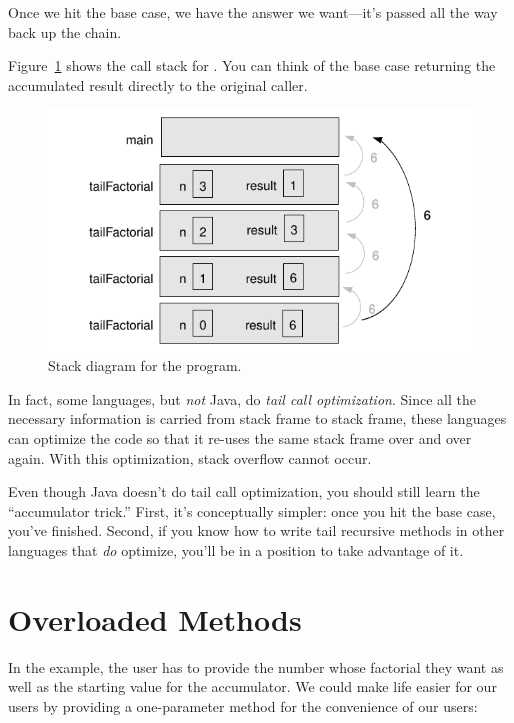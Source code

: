 Once we hit the base case, we have the answer we want---it's passed all the way back up the chain.

Figure~\ref{fig.tail_recursive} shows the call stack for . You can think of the base case returning the accumulated result directly to the original caller.

\begin{figure}[!htb]
\begin{center}
\includegraphics{figs/ch08/stack4.pdf}
\caption{Stack diagram for the  program.}
\label{fig.tail_recursive}
\end{center}
\end{figure}

 In fact, some languages, but {\em not} Java, do {\em tail call optimization}. Since all the necessary information is carried from stack frame to stack frame, these languages can optimize the code so that it re-uses the same stack frame over and over again. With this optimization, stack overflow cannot occur.

Even though Java doesn't do tail call optimization, you should still learn the ``accumulator trick.'' First, it's conceptually simpler: once you hit the base case, you've finished. Second, if you know how to write tail recursive methods in other languages that {\em do} optimize, you'll be in a position to take advantage of it.

\section{Overloaded Methods}
In the  example, the user has to provide the number whose factorial they want as well as the starting value for the accumulator. We could make life easier for our users by providing a one-parameter  method for the convenience of our users:

